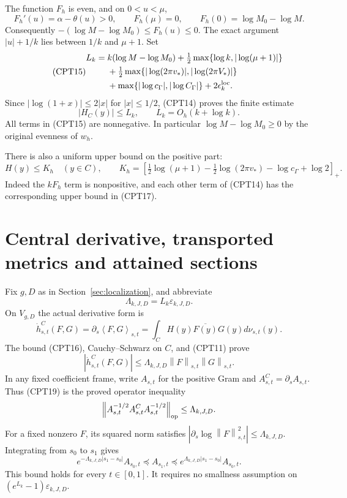 \documentclass[11pt]{article}
\newcommand{\norm}[1]{\left\lVert#1\right\rVert}
\newcommand{\ip}[2]{\left\langle#1,#2\right\rangle}
\begin{document}
The function \(F_h\) is even, and on \(0<u<\mu\),
\[
 F_h'(u)=\alpha-\theta(u)>0,\qquad F_h(\mu)=0,\qquad
 F_h(0)=\log M_0-\log M.
\]
Consequently \(-(\log M-\log M_0)\le F_h(u)\le0\).
The exact argument \(|u|+1/k\) lies between \(1/k\) and \(\mu+1\).
Set
\begin{equation}\tag{CPT15}
\begin{split}
 L_k={}&k(\log M-\log M_0)
 +\tfrac12\max\{\log k,|\log(\mu+1)|\}\\
 &+\tfrac12\max\{|\log(2\pi v_*)|,|\log(2\pi V_*)|\}\\
 &+\max\{|\log c_\Gamma|,|\log C_\Gamma|\}
 +2\epsilon_k^{\rm loc}.
\end{split}
\end{equation}
Since \(|\log(1+x)|\le2|x|\) for \(|x|\le1/2\),
(CPT14) proves the finite estimate
\begin{equation}\tag{CPT16}
 |H_C(y)|\le L_k,\qquad L_k=O_h(k+\log k).
\end{equation}
All terms in (CPT15) are nonnegative.  In particular
\(\log M-\log M_0\ge0\) by the original evenness of \(w_h\).

There is also a uniform upper bound on the positive part:
\begin{equation}\tag{CPT17}
 H(y)\le K_h\quad(y\in C),\qquad
 K_h=\left[
 \tfrac12\log(\mu+1)-\tfrac12\log(2\pi v_*)
 -\log c_\Gamma+\log2\right]_+.
\end{equation}
Indeed the \(kF_h\) term is nonpositive, and each other term of
(CPT14) has the corresponding upper bound in (CPT17).

\section{Central derivative, transported metrics and attained sections}
\label{sec:sections}

Fix \(g,D\) as in Section~\ref{sec:localization}, and abbreviate
\begin{equation}\tag{CPT18}
 \Lambda_{k,J,D}=L_k\varepsilon_{k,J,D}.
\end{equation}
On \(V_{g,D}\) the actual derivative form is
\[
 \dot h^C_{s,t}(F,G)
 =\partial_s\ip{F}{G}_{s,t}
 =\int_C H(y)\overline{F(y)}G(y)d\nu_{s,t}(y).
\]
The bound (CPT16), Cauchy--Schwarz on \(C\), and (CPT11) prove
\begin{equation}\tag{CPT19}
 |\dot h^C_{s,t}(F,G)|
 \le\Lambda_{k,J,D}\norm{F}_{s,t}\norm{G}_{s,t}.
\end{equation}
In any fixed coefficient frame, write \(A_{s,t}\) for the
positive Gram and \(A^C_{s,t}=\partial_s A_{s,t}\).
Thus (CPT19) is the proved operator inequality
\[
 \norm{A_{s,t}^{-1/2}A^C_{s,t}A_{s,t}^{-1/2}}_{\rm op}
 \le\Lambda_{k,J,D}.
\]
For a fixed nonzero \(F\), its squared norm satisfies
\(|\partial_s\log\norm{F}_{s,t}^2|\le\Lambda_{k,J,D}\).
Integrating from \(s_0\) to \(s_1\) gives
\begin{equation}\tag{CPT20}
 e^{-\Lambda_{k,J,D}|s_1-s_0|}A_{s_0,t}
 \preceq A_{s_1,t}
 \preceq e^{\Lambda_{k,J,D}|s_1-s_0|}A_{s_0,t}.
\end{equation}
This bound holds for every \(t\in[0,1]\).
It requires no smallness assumption on
\((e^{L_k}-1)\varepsilon_{k,J,D}\).
\end{document}
